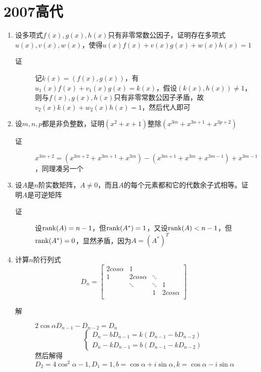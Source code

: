 \section{2007高代}
\begin{enumerate}
\item 设多项式$f(x),g(x),h(x)$只有非零常数公因子，证明存在多项式$u(x),v(x),w(x)$，使得$u(x)f(x)+v(x)g(x)+w(x)h(x)=1$
\begin{description}
\item[证] 记$k(x)=(f(x),g(x))$，有$u_1(x)f(x)+v_1(x)g(x)=k(x)$，假设$(k(x),h(x))\neq 1$，则与$f(x),g(x),h(x)$只有非零常数公因子矛盾，故$v_2(x)k(x)+w_2(x)h(x)=1$，然后代人即可
\end{description}

\item 设$m,n,p$都是非负整数，证明$(x^2+x+1)$整除$(x^{3m}+x^{3n+1}+x^{3p+2})$
\begin{description}
\item[证] $x^{3m+2}=(x^{3m+2}+x^{3m+1}+x^{3m})-(x^{3m+1}+x^{3m}+x^{3m-1})+x^{3m-1}$，同理凑另一个
\end{description}

\item 设$A$是$n$阶实数矩阵，$A\neq 0$，而且$A$的每个元素都和它的代数余子式相等。证明$A$是可逆矩阵
\begin{description}
\item[证] 设$\operatorname{rank}(A)=n-1$，但$\operatorname{rank}(A^*)=1$，又设$\operatorname{rank}(A)<n-1$，但$\operatorname{rank}(A^*)=0$，显然矛盾，因为$A=(A^*)^T$
\end{description}


\item 计算$n$阶行列式
\[
D_n =
\left[
\begin{array}{cccc}
2cos\alpha & 1 & & \\
1 & 2cos\alpha & \ddots & \\
 & \ddots & \ddots & 1 \\
 & & 1 & 2cos\alpha \\
\end{array} \right]
\]
\begin{description}
\item[解] $2\cos\alpha D_{n-1}-D_{n-2}=D_n$
\[
\begin{cases}
D_n - bD_{n-1}=k(D_{n-1}-bD_{n-2})\\
D_n - kD_{n-1}=b(D_{n-1}-kD_{n-2})
\end{cases}
\]
然后解得$D_2=4\cos^2\alpha-1,D_1=1,b=\cos\alpha+i\sin\alpha,k=\cos\alpha-i\sin\alpha$
\end{description}


\end{enumerate}

